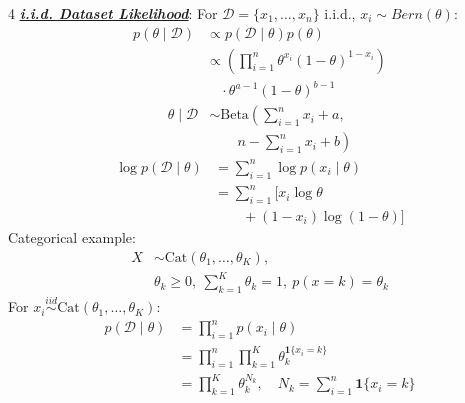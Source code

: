 \documentclass[12pt]{article}
\newcommand{\bulletPoint}[1]{\ul{\textit{\textbf{#1}}}}
\begin{document}
\begin{multicols*}{4}
\bulletPoint{i.i.d. Dataset Likelihood}:
For $\mathcal{D}=\{x_1,\ldots,x_n\}$ i.i.d., $x_i\sim Bern(\theta)$:
\useshortskip \begin{equation*}
    \begin{split}
        p(\theta\mid\mathcal{D}) &\propto p(\mathcal{D}\mid\theta)p(\theta) \\
        &\propto \left(\prod_{i=1}^{n}\theta^{x_i}(1-\theta)^{1-x_i}\right) \\
        &\quad \cdot \theta^{a-1}(1-\theta)^{b-1}
    \end{split}
\end{equation*}
\useshortskip \begin{equation*}
    \begin{split}
        \theta\mid\mathcal{D}
        &\sim \mathrm{Beta}\!\left(\sum_{i=1}^{n}x_i+a,\right.\\
        &\left.\qquad n-\sum_{i=1}^{n}x_i+b\right)
    \end{split}
\end{equation*}
\useshortskip \begin{equation*}
    \begin{split}
        \log p(\mathcal{D}\mid\theta)
        &=\sum_{i=1}^{n}\log p(x_i\mid\theta) \\
        &=\sum_{i=1}^{n}\big[x_i\log\theta \\
        &\qquad +(1-x_i)\log(1-\theta)\big]
    \end{split}
\end{equation*}
Categorical example:
\useshortskip \begin{equation*}
    \begin{split}
        X &\sim \mathrm{Cat}(\theta_1,\ldots,\theta_K), \\
        &\theta_k\ge 0,\ \sum_{k=1}^{K}\theta_k=1,\ 
        p(x=k)=\theta_k
    \end{split}
\end{equation*}
For $x_i \stackrel{iid}{\sim}\mathrm{Cat}(\theta_1,\ldots,\theta_K)$:
\useshortskip \begin{equation*}
    \begin{split}
        p(\mathcal{D}\mid\theta)
        &=\prod_{i=1}^{n}p(x_i\mid\theta) \\
        &=\prod_{i=1}^{n}\prod_{k=1}^{K}\theta_k^{\mathbf{1}\{x_i=k\}} \\
        &=\prod_{k=1}^{K}\theta_k^{N_k},
        \quad N_k=\sum_{i=1}^{n}\mathbf{1}\{x_i=k\}
    \end{split}
\end{equation*}


\end{multicols*}
\end{document}

